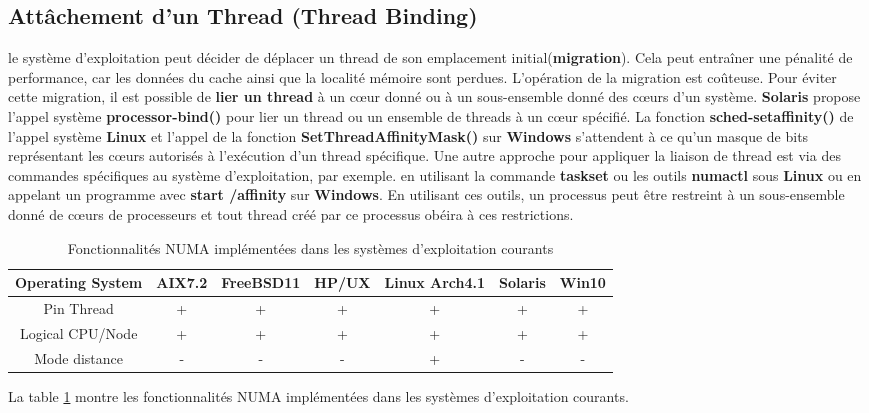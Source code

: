 \subsection{Attâchement d'un Thread (Thread Binding)}
%
le système d'exploitation peut décider de déplacer un thread de son emplacement initial(\textbf{migration}). 
Cela peut entraîner une pénalité de performance, car les données du cache ainsi que la localité mémoire sont perdues. L'opération de la migration est coûteuse. 
Pour éviter cette migration, il est possible de \textbf{lier un thread} à un cœur donné ou à un sous-ensemble donné des cœurs d'un système. 
\textbf{Solaris} propose l'appel système \textbf{processor-bind()} pour lier un thread ou un ensemble de threads à un cœur spécifié. 
La fonction \textbf{sched-setaffinity()} de l'appel système \textbf{Linux} et l'appel de la fonction \textbf{SetThreadAffinityMask()} sur \textbf{Windows} s'attendent à ce qu'un masque de bits représentant les cœurs autorisés à l'exécution d'un thread spécifique. 
Une autre approche pour appliquer la liaison de thread est via des commandes spécifiques au système d'exploitation, par exemple. en utilisant la commande \textbf{taskset} ou les outils \textbf{numactl} sous \textbf{Linux} ou en appelant un programme avec \textbf{start /affinity} sur \textbf{Windows}. 
En utilisant ces outils, un processus peut être restreint à un sous-ensemble donné de cœurs de processeurs et tout thread créé par ce processus obéira à ces restrictions. 
%
\begin{table}[h!]
\centering
\begin{tabular}{| c | c | c | c | c | c | c |} 
\hline
Operating System    & AIX7.2    & FreeBSD11  & HP/UX  & Linux Arch4.1 & Solaris & Win10 \\ [0.5ex] \hline
Pin Thread             & +    & +  & +  & +  & +  & + \\ [0.5ex] \hline
Logical CPU/Node 	& +    & +  & +  & +  & +  & +  \\ [0.5ex] \hline
Mode distance        & -     & -   & -   & +   & -  & -  \\ [0.5ex] \hline
\end{tabular}
\caption{Fonctionnalités NUMA implémentées dans les systèmes d'exploitation courants} %
\label{table:TB_2_214}
\end{table}
%
La table \ref{table:TB_2_214} montre les fonctionnalités NUMA implémentées dans les systèmes d'exploitation courants.
%
\newpage
